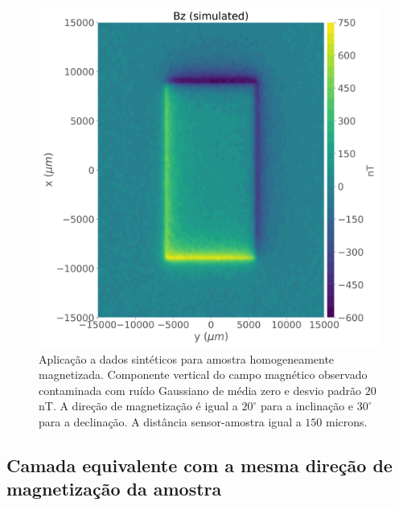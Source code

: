 \begin{figure}
	\centering
	\includegraphics[width=.8\textwidth]{Fig/mag_vec/amostra_homo_correto/noisy_bz_sample.png}
	\caption{Aplicação a dados sintéticos para amostra homogeneamente magnetizada. Componente vertical do campo magnético observado contaminada com ruído Gaussiano de média zero e desvio padrão $20$ nT. A direção de magnetização é igual a $20^\circ$ para a inclinação e $30^\circ$ para a declinação. A distância sensor-amostra igual a $150$ microns. }
	\label{fig:bz_homo_sample}
\end{figure}

\subsection{Camada equivalente com a mesma direção de magnetização da amostra}
\label{subsec:homo_same_dir}

